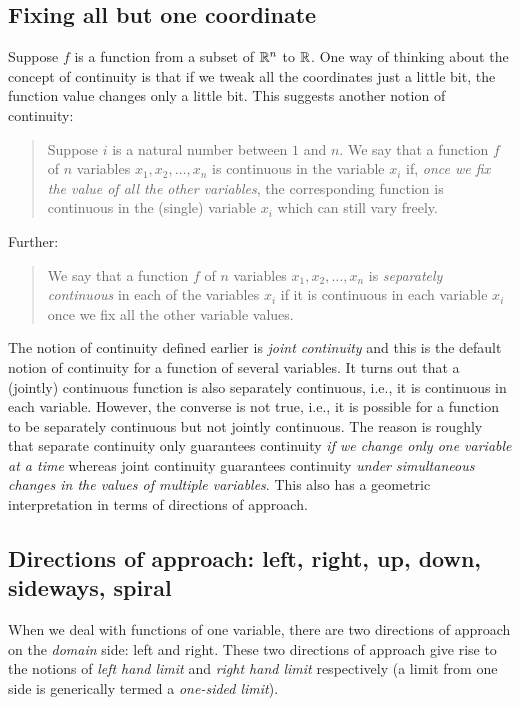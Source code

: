 \documentclass[10pt]{amsart}
\begin{document}
\subsection{Fixing all but one coordinate}

Suppose $f$ is a function from a subset of $\mathbb{R}^n$ to $\mathbb{R}$. One way of
thinking about the concept of continuity is that if we tweak all the
coordinates just a little bit, the function value changes only a
little bit. This suggests another notion of continuity:

\begin{quote}
  Suppose $i$ is a natural number between $1$ and $n$. We say that a
  function $f$ of $n$ variables $x_1, x_2, \dots, x_n$ is continuous
  in the variable $x_i$ if, {\em once we fix the value of all the
  other variables}, the corresponding function is continuous in the
  (single) variable $x_i$ which can still vary freely.
\end{quote}

Further:

\begin{quote}
  We say that a function $f$ of $n$ variables $x_1, x_2, \dots, x_n$
  is {\em separately continuous} in each of the variables $x_i$ if it
  is continuous in each variable $x_i$ once we fix all the other
  variable values.
\end{quote}

The notion of continuity defined earlier is {\em joint continuity} and
this is the default notion of continuity for a function of several
variables. It turns out that a (jointly) continuous function is also
separately continuous, i.e., it is continuous in each
variable. However, the converse is not true, i.e., it is possible for
a function to be separately continuous but not jointly continuous. The
reason is roughly that separate continuity only guarantees continuity
{\em if we change only one variable at a time} whereas joint
continuity guarantees continuity {\em under simultaneous changes in
the values of multiple variables}. This also has a geometric
interpretation in terms of directions of approach.
\subsection{Directions of approach: left, right, up, down, sideways, spiral}

When we deal with functions of one variable, there are two directions
of approach on the {\em domain} side: left and right. These two
directions of approach give rise to the notions of {\em left hand
limit} and {\em right hand limit} respectively (a limit from one side
is generically termed a {\em one-sided limit}).
\end{document}
